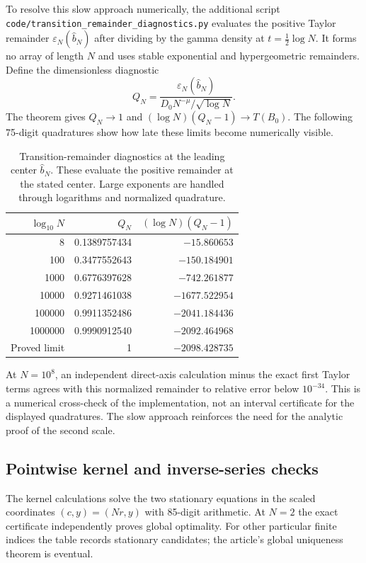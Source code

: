 \documentclass[11pt]{article}
\numberwithin{equation}{section}
\theoremstyle{definition}
\theoremstyle{remark}
\begin{document}
To resolve this slow approach numerically, the additional script
\nolinkurl{code/transition_remainder_diagnostics.py} evaluates the
positive Taylor remainder $\varepsilon_N(\widehat b_N)$ after dividing
by the gamma density at $t=\tfrac12\log N$. It forms no array of
length $N$ and uses stable exponential and hypergeometric remainders.
Define the dimensionless diagnostic
\[
 Q_N=\frac{\varepsilon_N(\widehat b_N)}
              {D_0N^{-\mu}/\sqrt{\log N}}.
\]
The theorem gives $Q_N\to1$ and
$(\log N)(Q_N-1)\to T(B_0)$. The following 75-digit quadratures
show how late these limits become numerically visible.

\begin{table}[htbp]
\centering
\begin{tabular}{rrr}
\toprule
$\log_{10}N$ & $Q_N$ & $(\log N)(Q_N-1)$\\
\midrule
8 & 0.1389757434 & $-15.860653$\\
100 & 0.3477552643 & $-150.184901$\\
1000 & 0.6776397628 & $-742.261877$\\
10000 & 0.9271461038 & $-1677.522954$\\
100000 & 0.9911352486 & $-2041.184436$\\
1000000 & 0.9990912540 & $-2092.464968$\\
\midrule
Proved limit & 1 & $-2098.428735$\\
\bottomrule
\end{tabular}
\caption{Transition-remainder diagnostics at the leading center
$\widehat b_N$. These evaluate the positive remainder at the stated
center. Large exponents are handled through
logarithms and normalized quadrature.}
\label{tab:transition-diagnostics}
\end{table}

At $N=10^8$, an independent direct-axis calculation minus the exact
first Taylor terms agrees with this normalized remainder to relative
error below $10^{-34}$. This is a numerical cross-check of the
implementation, not an interval certificate for the displayed
quadratures. The slow approach reinforces the need for the analytic
proof of the second scale.

\subsection{Pointwise kernel and inverse-series checks}

The kernel calculations solve the two stationary equations in the
scaled coordinates $(c,y)=(Nr,y)$ with 85-digit arithmetic.
At $N=2$ the exact certificate independently proves global optimality.
For other particular finite indices the table records stationary
candidates; the article's global uniqueness theorem is eventual.
\end{document}
